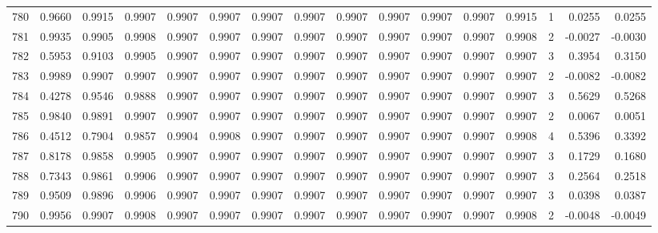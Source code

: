 \begin{tabular}{lrrrrrrrrrrrrrrr}
780 &      0.9660 &  0.9915 &  0.9907 &  0.9907 &  0.9907 &  0.9907 &  0.9907 &  0.9907 &  0.9907 &  0.9907 &   0.9907 &     0.9915 &      1 &                    0.0255 &                     0.0255 \\
781 &      0.9935 &  0.9905 &  0.9908 &  0.9907 &  0.9907 &  0.9907 &  0.9907 &  0.9907 &  0.9907 &  0.9907 &   0.9907 &     0.9908 &      2 &                   -0.0027 &                    -0.0030 \\
782 &      0.5953 &  0.9103 &  0.9905 &  0.9907 &  0.9907 &  0.9907 &  0.9907 &  0.9907 &  0.9907 &  0.9907 &   0.9907 &     0.9907 &      3 &                    0.3954 &                     0.3150 \\
783 &      0.9989 &  0.9907 &  0.9907 &  0.9907 &  0.9907 &  0.9907 &  0.9907 &  0.9907 &  0.9907 &  0.9907 &   0.9907 &     0.9907 &      2 &                   -0.0082 &                    -0.0082 \\
784 &      0.4278 &  0.9546 &  0.9888 &  0.9907 &  0.9907 &  0.9907 &  0.9907 &  0.9907 &  0.9907 &  0.9907 &   0.9907 &     0.9907 &      3 &                    0.5629 &                     0.5268 \\
785 &      0.9840 &  0.9891 &  0.9907 &  0.9907 &  0.9907 &  0.9907 &  0.9907 &  0.9907 &  0.9907 &  0.9907 &   0.9907 &     0.9907 &      2 &                    0.0067 &                     0.0051 \\
786 &      0.4512 &  0.7904 &  0.9857 &  0.9904 &  0.9908 &  0.9907 &  0.9907 &  0.9907 &  0.9907 &  0.9907 &   0.9907 &     0.9908 &      4 &                    0.5396 &                     0.3392 \\
787 &      0.8178 &  0.9858 &  0.9905 &  0.9907 &  0.9907 &  0.9907 &  0.9907 &  0.9907 &  0.9907 &  0.9907 &   0.9907 &     0.9907 &      3 &                    0.1729 &                     0.1680 \\
788 &      0.7343 &  0.9861 &  0.9906 &  0.9907 &  0.9907 &  0.9907 &  0.9907 &  0.9907 &  0.9907 &  0.9907 &   0.9907 &     0.9907 &      3 &                    0.2564 &                     0.2518 \\
789 &      0.9509 &  0.9896 &  0.9906 &  0.9907 &  0.9907 &  0.9907 &  0.9907 &  0.9907 &  0.9907 &  0.9907 &   0.9907 &     0.9907 &      3 &                    0.0398 &                     0.0387 \\
790 &      0.9956 &  0.9907 &  0.9908 &  0.9907 &  0.9907 &  0.9907 &  0.9907 &  0.9907 &  0.9907 &  0.9907 &   0.9907 &     0.9908 &      2 &                   -0.0048 &                    -0.0049 \\

\end{tabular}
